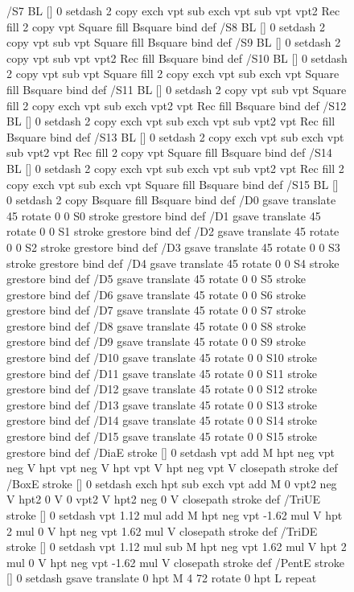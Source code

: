 \documentclass{LMCS}
\begin{document}
\begin{figure}[!tbp]
\begin{minipage}[b]{.45\linewidth}
{{{/S7 { BL [] 0 setdash 2 copy exch vpt sub exch vpt sub vpt vpt2 Rec fill
       2 copy vpt Square fill
       Bsquare } bind def
/S8 { BL [] 0 setdash 2 copy vpt sub vpt Square fill Bsquare } bind def
/S9 { BL [] 0 setdash 2 copy vpt sub vpt vpt2 Rec fill Bsquare } bind def
/S10 { BL [] 0 setdash 2 copy vpt sub vpt Square fill 2 copy exch vpt sub exch vpt Square fill
       Bsquare } bind def
/S11 { BL [] 0 setdash 2 copy vpt sub vpt Square fill 2 copy exch vpt sub exch vpt2 vpt Rec fill
       Bsquare } bind def
/S12 { BL [] 0 setdash 2 copy exch vpt sub exch vpt sub vpt2 vpt Rec fill Bsquare } bind def
/S13 { BL [] 0 setdash 2 copy exch vpt sub exch vpt sub vpt2 vpt Rec fill
       2 copy vpt Square fill Bsquare } bind def
/S14 { BL [] 0 setdash 2 copy exch vpt sub exch vpt sub vpt2 vpt Rec fill
       2 copy exch vpt sub exch vpt Square fill Bsquare } bind def
/S15 { BL [] 0 setdash 2 copy Bsquare fill Bsquare } bind def
/D0 { gsave translate 45 rotate 0 0 S0 stroke grestore } bind def
/D1 { gsave translate 45 rotate 0 0 S1 stroke grestore } bind def
/D2 { gsave translate 45 rotate 0 0 S2 stroke grestore } bind def
/D3 { gsave translate 45 rotate 0 0 S3 stroke grestore } bind def
/D4 { gsave translate 45 rotate 0 0 S4 stroke grestore } bind def
/D5 { gsave translate 45 rotate 0 0 S5 stroke grestore } bind def
/D6 { gsave translate 45 rotate 0 0 S6 stroke grestore } bind def
/D7 { gsave translate 45 rotate 0 0 S7 stroke grestore } bind def
/D8 { gsave translate 45 rotate 0 0 S8 stroke grestore } bind def
/D9 { gsave translate 45 rotate 0 0 S9 stroke grestore } bind def
/D10 { gsave translate 45 rotate 0 0 S10 stroke grestore } bind def
/D11 { gsave translate 45 rotate 0 0 S11 stroke grestore } bind def
/D12 { gsave translate 45 rotate 0 0 S12 stroke grestore } bind def
/D13 { gsave translate 45 rotate 0 0 S13 stroke grestore } bind def
/D14 { gsave translate 45 rotate 0 0 S14 stroke grestore } bind def
/D15 { gsave translate 45 rotate 0 0 S15 stroke grestore } bind def
/DiaE { stroke [] 0 setdash vpt add M
  hpt neg vpt neg V hpt vpt neg V
  hpt vpt V hpt neg vpt V closepath stroke } def
/BoxE { stroke [] 0 setdash exch hpt sub exch vpt add M
  0 vpt2 neg V hpt2 0 V 0 vpt2 V
  hpt2 neg 0 V closepath stroke } def
/TriUE { stroke [] 0 setdash vpt 1.12 mul add M
  hpt neg vpt -1.62 mul V
  hpt 2 mul 0 V
  hpt neg vpt 1.62 mul V closepath stroke } def
/TriDE { stroke [] 0 setdash vpt 1.12 mul sub M
  hpt neg vpt 1.62 mul V
  hpt 2 mul 0 V
  hpt neg vpt -1.62 mul V closepath stroke } def
/PentE { stroke [] 0 setdash gsave
  translate 0 hpt M 4 {72 rotate 0 hpt L} repeat
}}}}
\end{minipage}
\end{figure}
\end{document}
